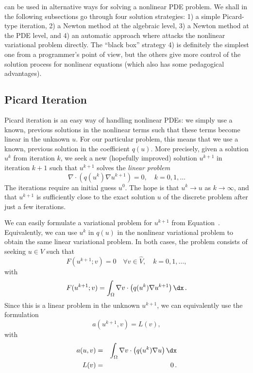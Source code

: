 \fenics{} can be used in alternative ways for solving a nonlinear PDE
problem. We shall in the following subsections go through four
solution strategies:
1) a simple Picard-type iteration,
2) a Newton method at the algebraic level,
3) a Newton method at the PDE level, and
4) an automatic approach where \fenics{} attacks the nonlinear variational
problem directly. The ``black box'' strategy 4) is definitely the
simplest one from a
programmer's point of view, but the others give more control of the
solution process for nonlinear equations (which also has some
pedagogical advantages).

\subsection{Picard Iteration}
\label{langtangen:nonlinear:Picard}

Picard iteration is an easy way of handling nonlinear PDEs: we simply
use a known, previous solutions in the nonlinear terms such that these
terms become linear in the unknown $u$.
For our particular problem,
this means that we use a known, previous solution in the coefficient $q(u)$.
More precisely, given a solution $u^k$ from iteration $k$, we seek a
new (hopefully improved) solution $u^{k+1}$ in iteration $k+1$ such
that $u^{k+1}$ solves the \emph{linear problem}
\begin{equation}
\label{langtangen:poisson:nonlinear:picard1}
\nabla\cdot \left(q(u^k)\nabla u^{k+1}\right) = 0,\quad k=0,1,\ldots
\end{equation}
The iterations require an initial guess $u^0$.
The hope is that $u^{k} \rightarrow u$ as $k\rightarrow\infty$, and that
$u^{k+1}$ is sufficiently close to the exact
solution $u$ of the discrete problem after just a few iterations.

We can easily formulate a variational problem for $u^{k+1}$ from
Equation~.
Equivalently, we can use $u^k$ in $q(u)$ in
the nonlinear variational problem 
to obtain the same linear variational problem.
In both cases, the problem consists of seeking
$u \in V$ such that
\begin{equation} \label{langtangen:poisson:nonlinear:picard2}
  F(u^{k+1}; v) = 0 \quad \forall v \in \hat{V},\quad k=0,1,\ldots,
\end{equation}
with
\begin{equation}
\label{langtangen:poisson:nonlinear:picard3}
F(u^{k+1}; v) = \int_\Omega \nabla v\cdot\left( q(u^k)\nabla u^{k+1}\right)\dx
\langtangenep
\end{equation}
Since this is a linear problem in the unknown $u^{k+1}$, we can equivalently
use the formulation
\begin{equation}
a(u^{k+1},v) = L(v),
\end{equation}
with
\begin{eqnarray}
a(u,v) &=& \int_\Omega \nabla v\cdot\left( q(u^k)\nabla u\right)\dx
\\
L(v) &=& 0\langtangenep
\end{eqnarray}

